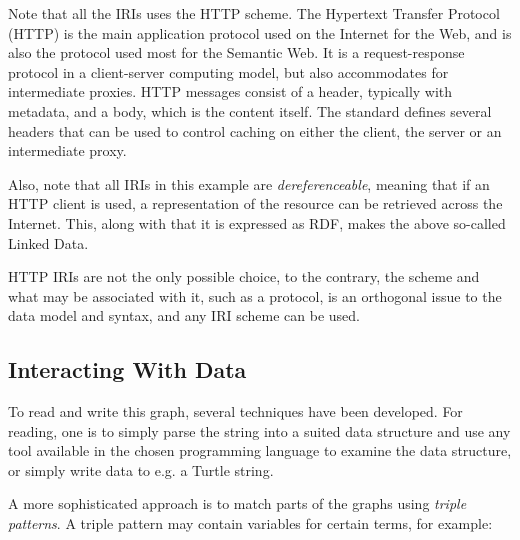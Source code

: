 Note that all the IRIs uses the HTTP scheme. The Hypertext Transfer
Protocol (HTTP) is the main application protocol used on the Internet
for the Web, and is also the protocol used most for the Semantic
Web. It is a request-response protocol in a client-server computing
model, but also accommodates for intermediate proxies. HTTP messages
consist of a header, typically with metadata, and a body, which is the
content itself. The standard defines several headers that can be used
to control caching on either the client, the server or an intermediate
proxy.

Also, note that all IRIs in this example are \emph{dereferenceable},
meaning that if an HTTP client is used, a representation of the
resource can be retrieved across the Internet. This, along with that
it is expressed as RDF, makes the above so-called Linked Data.

HTTP IRIs are not the only possible choice, to the contrary, the
scheme and what may be associated with it, such as a protocol, is an
orthogonal issue to the data model and syntax, and any IRI scheme can
be used.

\subsection{Interacting With Data}\label{sec:introinteract}

To read and write this graph, several techniques have been
developed. For reading, one is to simply parse the string into a
suited data structure and use any tool available in the chosen
programming language to examine the data structure, or simply write
data to e.g. a Turtle string.

A more sophisticated approach is to match parts of the graphs using
\emph{triple patterns}. A triple pattern may contain variables for
certain terms, for example:

